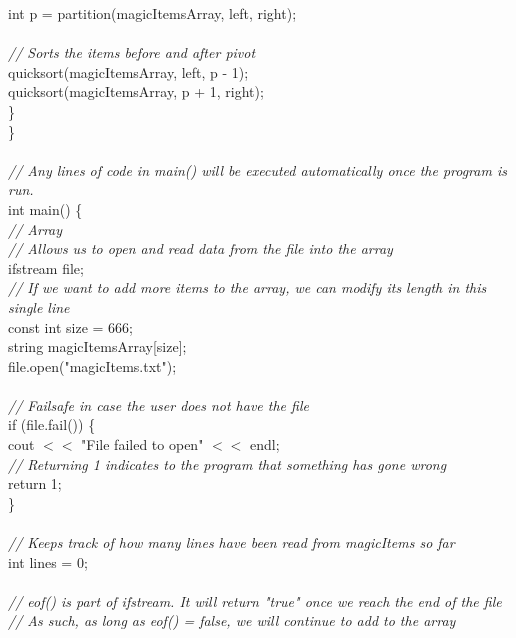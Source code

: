 \documentclass{article}
\begin{document}
\begin {linenumbers}
{        \indent \indent int p = partition(magicItemsArray, left, right);\\
\\
        \textit{\indent \indent // Sorts the items before and after pivot\\}
        \indent \indent quicksort(magicItemsArray, left, p - 1);\\
        \indent \indent quicksort(magicItemsArray, p + 1, right);\\
    \indent \}\\
\}\\
\\
\textit{// Any lines of code in main() will be executed automatically once the program is run.\\}
int main() \{\\
    \textit{\indent // Array \\
    \indent // Allows us to open and read data from the file into the array\\ }
    \indent ifstream file;\\
    \textit{\indent // If we want to add more items to the array, we can modify its length in this single line\\}
    \indent const int size = 666;\\
    \indent string magicItemsArray[size];\\
    \indent file.open("magicItems.txt");\\
\\
    \textit{\indent // Failsafe in case the user does not have the file\\}
    \indent if (file.fail()) \{\\
       \indent \indent cout $<<$ "File failed to open" $<<$ endl;\\
        \textit{\indent \indent // Returning 1 indicates to the program that something has gone wrong\\}
        \indent \indent return 1;\\
    \indent \}\\
\\
    \textit{\indent // Keeps track of how many lines have been read from magicItems so far\\}
    \indent int lines = 0;\\
\\
    \textit{\indent // eof() is part of ifstream. It will return "true" once we reach the end of the file\\
    \indent // As such, as long as eof() = false, we will continue to add to the array\\}
}
\end{linenumbers}
\end{document}
